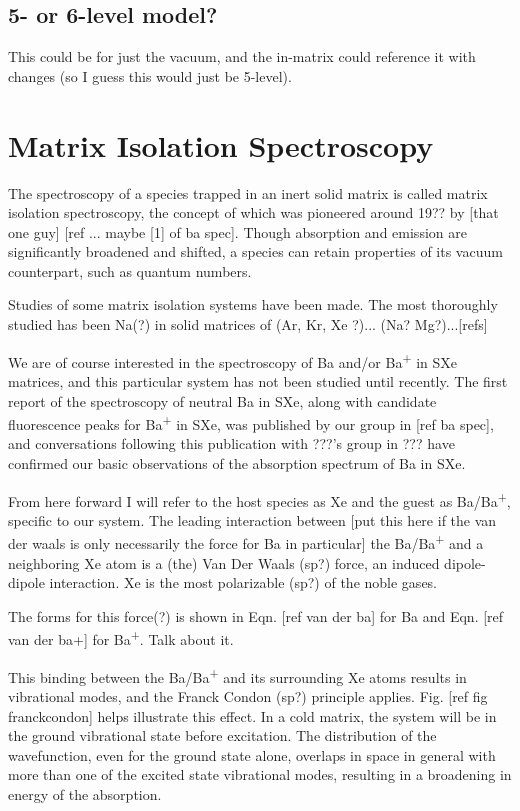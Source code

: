 \subsection{5- or 6-level model?}

This could be for just the vacuum, and the in-matrix could reference it with changes (so I guess this would just be 5-level).

\section{Matrix Isolation Spectroscopy}

The spectroscopy of a species trapped in an inert solid matrix is called matrix isolation spectroscopy, the concept of which was pioneered around 19?? by [that one guy] [ref ... maybe [1] of ba spec].  Though absorption and emission are significantly broadened and shifted, a species can retain properties of its vacuum counterpart, such as quantum numbers.

Studies of some matrix isolation systems have been made.  The most thoroughly studied has been Na(?) in solid matrices of (Ar, Kr, Xe ?)... (Na? Mg?)...[refs]

We are of course interested in the spectroscopy of Ba and/or Ba\textsuperscript{+} in SXe matrices, and this particular system has not been studied until recently.  The first report of the spectroscopy of neutral Ba in SXe, along with candidate fluorescence peaks for Ba\textsuperscript{+} in SXe, was published by our group in [ref ba spec], and conversations following this publication with ???'s group in ??? have confirmed our basic observations of the absorption spectrum of Ba in SXe.  

From here forward I will refer to the host species as Xe and the guest as Ba/Ba\textsuperscript{+}, specific to our system.  The leading interaction between {\color{gray}[put this here if the van der waals is only necessarily the force for Ba in particular]} the Ba/Ba\textsuperscript{+} and a neighboring Xe atom is a {\color{gray}(the)} Van Der Waals (sp?) force, an induced dipole-dipole interaction.  Xe is the most polarizable (sp?) of the noble gases.  

The forms for this force(?) is shown in Eqn. [ref van der ba] for Ba and Eqn. [ref van der ba+] for Ba\textsuperscript{+}.  {\color{gray}Talk about it.}

This binding between the Ba/Ba\textsuperscript{+} and its surrounding Xe atoms results in vibrational modes, and the Franck Condon (sp?) principle applies.  Fig. [ref fig franckcondon] helps illustrate this effect.  In a cold matrix, the system will be in the ground vibrational state before excitation.  The distribution of the wavefunction, even for the ground state alone, overlaps in space in general with more than one of the excited state vibrational modes, resulting in a broadening in energy of the absorption.

